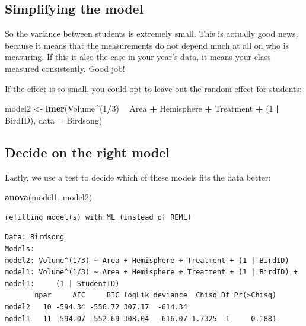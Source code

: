 \documentclass[
]{book}
\newenvironment{Shaded}{\begin{snugshade}}{\end{snugshade}}
\newcommand{\DataTypeTok}[1]{\textcolor[rgb]{0.13,0.29,0.53}{#1}}
\newcommand{\DecValTok}[1]{\textcolor[rgb]{0.00,0.00,0.81}{#1}}
\newcommand{\KeywordTok}[1]{\textcolor[rgb]{0.13,0.29,0.53}{\textbf{#1}}}
\newcommand{\NormalTok}[1]{#1}
\newcommand{\OperatorTok}[1]{\textcolor[rgb]{0.81,0.36,0.00}{\textbf{#1}}}
\newcommand{\StringTok}[1]{\textcolor[rgb]{0.31,0.60,0.02}{#1}}
\begin{document}
\hypertarget{simplifying-the-model}{%
\subsection{Simplifying the model}\label{simplifying-the-model}}

So the variance between students is extremely small. This is actually good news, because it means that the measurements do not depend much at all on who is measuring. If this is also the case in your year's data, it means your class measured consistently. Good job!

If the effect is so small, you could opt to leave out the random effect for students:

\begin{Shaded}
\begin{Highlighting}[]
\NormalTok{model2 <-}\StringTok{ }\KeywordTok{lmer}\NormalTok{(Volume}\OperatorTok{^}\NormalTok{(}\DecValTok{1}\OperatorTok{/}\DecValTok{3}\NormalTok{) }\OperatorTok{~}\StringTok{ }\NormalTok{Area }\OperatorTok{+}\StringTok{ }\NormalTok{Hemisphere }\OperatorTok{+}\StringTok{ }\NormalTok{Treatment }\OperatorTok{+}\StringTok{ }\NormalTok{(}\DecValTok{1} \OperatorTok{|}\StringTok{ }\NormalTok{BirdID), }\DataTypeTok{data =}\NormalTok{ Birdsong)}
\end{Highlighting}
\end{Shaded}

\hypertarget{comparebrain}{%
\subsection{Decide on the right model}\label{comparebrain}}

Lastly, we use a test to decide which of these models fits the data better:

\begin{Shaded}
\begin{Highlighting}[]
\KeywordTok{anova}\NormalTok{(model1, model2)}
\end{Highlighting}
\end{Shaded}

\begin{verbatim}
refitting model(s) with ML (instead of REML)
\end{verbatim}

\begin{verbatim}
Data: Birdsong
Models:
model2: Volume^(1/3) ~ Area + Hemisphere + Treatment + (1 | BirdID)
model1: Volume^(1/3) ~ Area + Hemisphere + Treatment + (1 | BirdID) + 
model1:     (1 | StudentID)
       npar     AIC     BIC logLik deviance  Chisq Df Pr(>Chisq)
model2   10 -594.34 -556.72 307.17  -614.34                     
model1   11 -594.07 -552.69 308.04  -616.07 1.7325  1     0.1881
\end{verbatim}
\end{document}
